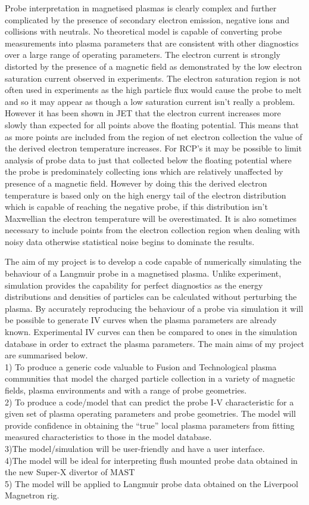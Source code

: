 \documentclass[12pt]{article}
\begin{document}
Probe interpretation in magnetised plasmas is clearly complex and further complicated by the presence of secondary electron emission, negative ions and collisions with neutrals. No theoretical model is capable of converting probe measurements into plasma parameters that are consistent with other diagnostics over a large range of operating parameters. The electron current is strongly distorted by the presence of a magnetic field as demonstrated by the low electron saturation current observed in experiments. The electron saturation region is not often used in experiments as the high particle flux would cause the probe to melt and so it may appear as though a low saturation current isn't really a problem. However it has been shown in JET that the electron current increases more slowly than expected for all points above the floating potential. This means that as more points are included from the region of net electron collection the value of the derived electron temperature increases. For RCP's it may be possible to limit analysis of probe data to just that collected below the floating potential where the probe is predominately collecting ions which are relatively unaffected by presence of a magnetic field. However by doing this the derived electron temperature is based only on the high energy tail of the electron distribution which is capable of reaching the negative probe, if this distribution isn't Maxwellian the electron temperature will be overestimated. It is also sometimes necessary to include points from the electron collection region when dealing with noisy data otherwise statistical noise begins to dominate the results.

The aim of my project is to develop a code capable of numerically simulating the behaviour of a Langmuir probe in a magnetised plasma. Unlike experiment, simulation provides the capability for perfect diagnostics as the energy distributions and densities of particles can be calculated without perturbing the plasma. By accurately reproducing the behaviour of a probe via simulation it will be possible to generate IV curves when the plasma parameters are already known. Experimental IV curves can then be compared to ones in the simulation database in order to extract the plasma parameters. The main aims of my project are summarised below. \\
1) To produce a generic code valuable to Fusion and Technological plasma communities that model the charged particle collection in a variety of magnetic fields, plasma environments and with a range of  probe geometries.\\
2) To produce a code/model that can predict the probe I-V characteristic for a given set of plasma operating parameters and probe geometries. The model will provide confidence in obtaining the “true”  local plasma parameters from  fitting measured characteristics to those in the model database.\\
3)The model/simulation will be user-friendly and have a user interface. \\
4)The model will be ideal for interpreting flush mounted probe data obtained in the new Super-X divertor of MAST\\
5) The model will be applied to Langmuir probe data obtained on the Liverpool Magnetron rig. 
\end{document}
